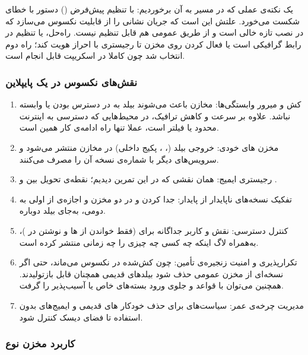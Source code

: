یک نکته‌ی عملی که در مسیر به آن برخوردیم: با تنظیم پیش‌فرض () دستور  با خطای  شکست می‌خورد. علتش این است که جریان  نشانی  را از قابلیت  نکسوس می‌سازد که در نصب تازه خالی است و از طریق  عمومی هم قابل تنظیم نیست. راه‌حل، یا تنظیم  در رابط گرافیکی است یا فعال کردن  روی مخزن تا رجیستری با  احراز هویت کند؛ راه دوم انتخاب شد چون کاملا در اسکریپت قابل انجام است.

\subsubsection*{ نقش‌های نکسوس در یک پایپلاین }

\begin{enumerate}
	\item {کش و میرور وابستگی‌ها}: مخازن  باعث می‌شوند بیلد به در دسترس بودن  یا  وابسته نباشد. علاوه بر سرعت و کاهش ترافیک، در محیط‌هایی که دسترسی به اینترنت محدود یا فیلتر است، عملا تنها راه ادامه‌ی کار همین است.
	\item {مخزن های خودی}: خروجی بیلد (، ، پکیج  داخلی) در مخازن  منتشر می‌شود و سرویس‌های دیگر با شماره‌ی نسخه آن را مصرف می‌کنند.
	\item {رجیستری ایمیج}: همان نقشی که در این تمرین دیدیم؛ نقطه‌ی تحویل بین  و .
	\item {تفکیک نسخه‌های ناپایدار از پایدار}: جدا کردن  و  در دو مخزن و اجازه‌ی  از اولی به دومی، به‌جای بیلد دوباره.
	\item {کنترل دسترسی}: نقش و کاربر جداگانه برای  (فقط خواندن از ها و نوشتن در )، به‌همراه لاگ اینکه چه کسی چه چیزی را چه زمانی منتشر کرده است.
	\item {تکرارپذیری و امنیت زنجیره‌ی تأمین}: چون  کش‌شده در نکسوس می‌ماند، حتی اگر نسخه‌ای از مخزن عمومی حذف شود بیلدهای قدیمی همچنان قابل بازتولیدند. همچنین می‌توان با قواعد  و  جلوی ورود بسته‌های خاص یا آسیب‌پذیر را گرفت.
	\item {مدیریت چرخه‌ی عمر}: سیاست‌های  برای حذف خودکار های قدیمی و ایمیج‌های بدون استفاده تا فضای دیسک کنترل شود.
\end{enumerate}

\subsubsection*{کاربرد مخزن نوع }


